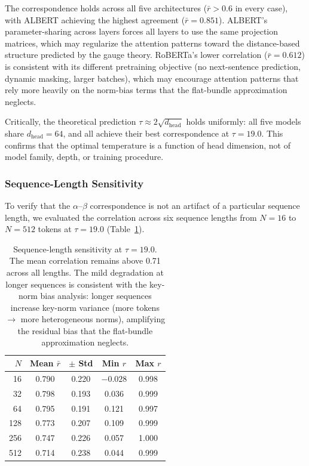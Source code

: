 \documentclass[twoside,11pt]{article}
\begin{document}
The correspondence holds across all five architectures ($\bar{r} > 0.6$ in every case), with ALBERT achieving the highest agreement ($\bar{r} = 0.851$). ALBERT's parameter-sharing across layers forces all layers to use the same projection matrices, which may regularize the attention patterns toward the distance-based structure predicted by the gauge theory. RoBERTa's lower correlation ($\bar{r} = 0.612$) is consistent with its different pretraining objective (no next-sentence prediction, dynamic masking, larger batches), which may encourage attention patterns that rely more heavily on the norm-bias terms that the flat-bundle approximation neglects.

Critically, the theoretical prediction $\tau \approx 2\sqrt{d_{\text{head}}}$ holds uniformly: all five models share $d_{\text{head}} = 64$, and all achieve their best correspondence at $\tau = 19.0$. This confirms that the optimal temperature is a function of head dimension, not of model family, depth, or training procedure.


\subsubsection{Sequence-Length Sensitivity}
\label{sec:seqlen}

To verify that the $\alpha$--$\beta$ correspondence is not an artifact of a particular sequence length, we evaluated the correlation across six sequence lengths from $N = 16$ to $N = 512$ tokens at $\tau = 19.0$ (Table~\ref{tab:seqlen}).

\begin{table}[h]
\centering
\renewcommand{\arraystretch}{1.15}
\begin{tabular}{rcccc}
\hline
$N$ & Mean $\bar{r}$ & $\pm$ Std & Min $r$ & Max $r$ \\
\hline
16  & 0.790 & 0.220 & $-0.028$ & 0.998 \\
32  & 0.798 & 0.193 & 0.036    & 0.999 \\
64  & 0.795 & 0.191 & 0.121    & 0.997 \\
128 & 0.773 & 0.207 & 0.109    & 0.999 \\
256 & 0.747 & 0.226 & 0.057    & 1.000 \\
512 & 0.714 & 0.238 & 0.044    & 0.999 \\
\hline
\end{tabular}
\caption{Sequence-length sensitivity at $\tau = 19.0$. The mean correlation remains above 0.71 across all lengths. The mild degradation at longer sequences is consistent with the key-norm bias analysis: longer sequences increase key-norm variance (more tokens $\to$ more heterogeneous norms), amplifying the residual bias that the flat-bundle approximation neglects.}
\label{tab:seqlen}
\end{table}
\end{document}
